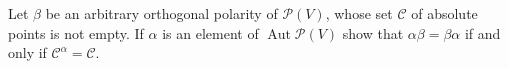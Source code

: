 Let $\beta$ be an arbitrary orthogonal polarity of $\mathcal{P}(V)$, whose set $\mathcal{C}$ of absolute points is not empty. If $\alpha$ is an element of $\operatorname{Aut} \mathcal{P}(V)$ show that $\alpha \beta = \beta \alpha$ if and only if $\mathcal{C}^{\alpha} = \mathcal{C}$.
